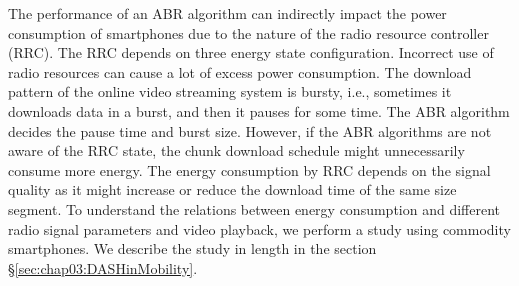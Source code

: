 The performance of an ABR algorithm can indirectly impact the power consumption of smartphones due to the nature of the radio resource controller (RRC). The RRC depends on three energy state configuration. Incorrect use of radio resources can cause a lot of excess power consumption. The download pattern of the online video streaming system is bursty, i.e., sometimes it downloads data in a burst, and then it pauses for some time. The ABR algorithm decides the pause time and burst size. However, if the ABR algorithms are not aware of the RRC state, the chunk download schedule might unnecessarily consume more energy. The energy consumption by RRC depends on the signal quality as it might increase or reduce the download time of the same size segment. To understand the relations between energy consumption and different radio signal parameters and video playback, we perform a study using commodity smartphones. We describe the study in length in the section \S\ref{sec:chap03:DASHinMobility}.

%

